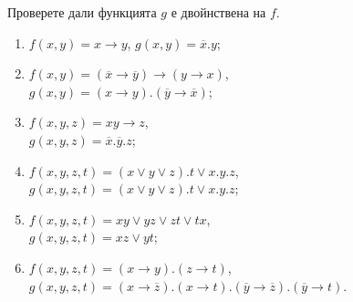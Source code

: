 \begin{problem} %
  Проверете дали функцията $g$ е двойнствена на $f$.
  \begin{enumerate}[1)]
  \item
    $f(x,y) = x\rightarrow y$, $g(x,y) = \overline{x}.y$;
  \item
    $f(x,y) = (\overline{x}\rightarrow\overline{y})\rightarrow(y\rightarrow x)$, \\
    $g(x,y) = (x\rightarrow y).(\overline{y}\rightarrow\overline{x})$;
  \item
    $f(x,y,z) = xy \rightarrow z$,\\
    $g(x,y,z) = \overline{x}.\overline{y}.z$;
  \item
    $f(x,y,z,t) = (x\vee y\vee z).t\vee x.y.z$, \\
    $g(x,y,z,t) = (x\vee y\vee z).t\vee x.y.z$;
  \item
    $f(x,y,z,t) = xy\vee yz\vee zt\vee tx$, \\
    $g(x,y,z,t) = xz\vee yt$;
  \item
    $f(x,y,z,t) = (x\rightarrow y).(z\rightarrow t)$, \\
    $g(x,y,z,t) = (x\rightarrow\overline{z}).(x\rightarrow t).(\overline{y}\rightarrow\overline{z}).(\overline{y}\rightarrow t)$.
  \end{enumerate}
\end{problem}

